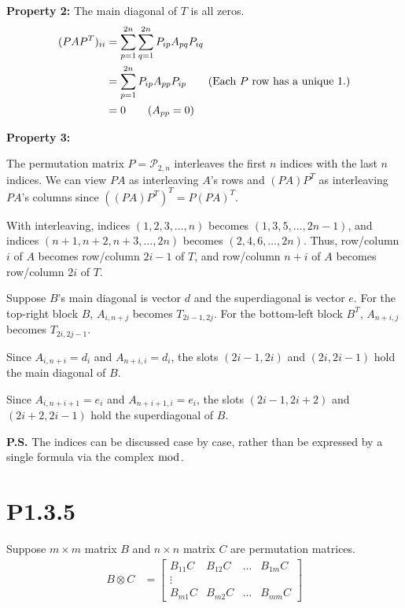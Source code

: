 \documentclass{article}
\begin{document}
\textbf{Property 2: } The main diagonal of $T$ is all zeros.
\begin{align*}
    (PAP^T)_{ii} & = \sum_{p=1}^{2n}\sum_{q=1}^{2n} P_{ip}A_{pq}P_{iq}                         \\
                 & = \sum_{p=1}^{2n}P_{ip}A_{pp}P_{ip} \tag*{(Each $P$ row has a unique $1$.)} \\
                 & = 0 \tag*{($A_{pp}=0$)}
\end{align*}

\textbf{Property 3: }

The permutation matrix $P=\mathcal{P}_{2,n}$ interleaves the first
$n$ indices with the last $n$ indices. We can view $PA$ as interleaving $A$'s rows and $(PA)P^T$ as interleaving
$PA$'s columns since $((PA)P^T)^T=P(PA)^T$.

With interleaving, indices $(1,2,3,\dots,n)$ becomes $(1,3,5,\dots,2n-1)$, and
indices $(n+1,n+2,n+3,\dots,2n)$ becomes $(2,4,6,\dots,2n)$.
Thus, row/column $i$ of $A$ becomes row/column $2i-1$ of $T$, and
row/column $n+i$ of $A$ becomes row/column $2i$ of $T$.

Suppose $B$'s main diagonal is vector $d$ and the superdiagonal
is vector $e$.
For the top-right block $B$, $A_{i,n+j}$ becomes $T_{2i-1,2j}$.
For the bottom-left block $B^T$, $A_{n+i,j}$ becomes $T_{2i,2j-1}$.

Since $A_{i,n+i}=d_i$ and $A_{n+i,i}=d_i$, the slots $(2i-1,2i)$ and $(2i,2i-1)$
hold the main diagonal of $B$.

Since $A_{i,n+i+1}=e_i$ and $A_{n+i+1,i}=e_i$, the slots
$(2i-1,2i+2)$ and $(2i+2,2i-1)$ hold the superdiagonal of $B$.

\textbf{P.S.} The indices can be discussed case by case, rather than be
expressed by a single formula via the complex $\bmod$.

\section*{P1.3.5}
Suppose $m\times m$ matrix $B$ and $n \times n$ matrix $C$ are permutation matrices.
\begin{align*}
    B \otimes C & =
    \begin{bmatrix}
        B_{11}C & B_{12}C & \dots & B_{1m}C \\
        \vdots                              \\
        B_{m1}C & B_{m2}C & \dots & B_{mm}C
    \end{bmatrix}
\end{align*}
\end{document}
